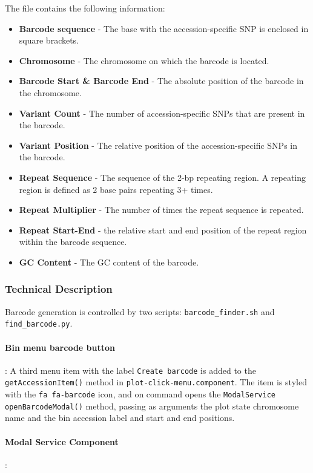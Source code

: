 \documentclass[12pt]{article}
\begin{document}
The file contains the following information: 
\begin{itemize}
    \item \textbf{Barcode sequence} - The base with the accession-specific SNP is enclosed in square brackets.
    \item \textbf{Chromosome} - The chromosome on which the barcode is located.
    \item \textbf{Barcode Start \& Barcode End} - The absolute position of the barcode in the chromosome.
    \item \textbf{Variant Count} - The number of accession-specific SNPs that are present in the barcode.
    \item \textbf{Variant Position} - The relative position of the accession-specific SNPs in the barcode. 
    \item \textbf{Repeat Sequence} - The sequence of the 2-bp repeating region. A repeating region is defined as 2 base pairs repeating 3+ times. 
    \item \textbf{Repeat Multiplier} - The number of times the repeat sequence is repeated.
    \item \textbf{Repeat Start-End} - the relative start and end position of the repeat region within the barcode sequence. 
    \item \textbf{GC Content} - The GC content of the barcode. 
\end{itemize}

\subsubsection{Technical Description}

Barcode generation is controlled by two scripts: \verb+barcode_finder.sh+ and \verb+find_barcode.py+. 

\paragraph{Bin menu barcode button}:
A third menu item with the label \verb+Create barcode+ is added to the \verb+getAccessionItem()+ method in \verb+plot-click-menu.component+. The item is styled with the \verb+fa fa-barcode+ icon, and on command opens the \verb+ModalService openBarcodeModal()+ method, passing as arguments the plot state chromosome name and the bin accession label and start and end positions.

\paragraph{Modal Service Component}:
\end{document}
